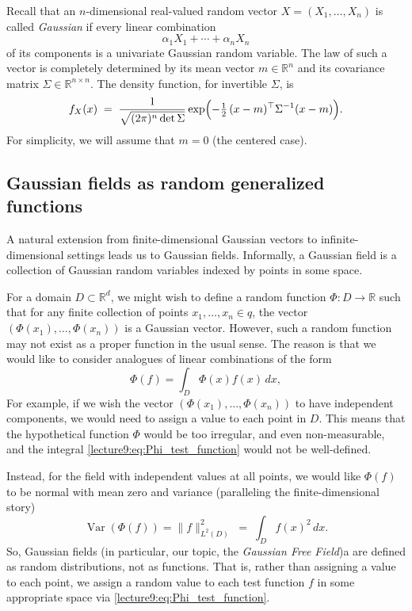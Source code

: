 \documentclass[letterpaper,11pt,oneside,reqno]{book}
\numberwithin{equation}{chapter}  %
\theoremstyle{definition}
\begin{document}
Recall that an $n$-dimensional real-valued random vector $X = (X_1,\dots, X_n)$ is called \emph{Gaussian} if every linear combination
\[
\alpha_1 X_1 + \cdots + \alpha_n X_n
\]
of its components is a univariate Gaussian random variable. The law of such a vector is completely determined by its mean vector $m \in \mathbb{R}^n$ and its covariance matrix $\Sigma \in \mathbb{R}^{n\times n}$. The density function, for invertible $\Sigma$, is
\[
f_{X}(x) \;=\; \frac{1}{\sqrt{(2\pi)^n \det \Sigma}}
\exp\Bigl(-\tfrac{1}{2}\,(x - m)^\top \Sigma^{-1}(x - m)\Bigr).
\]
For simplicity, we will assume that $m = 0$ (the centered case).

\subsection{Gaussian fields as random generalized functions}

A natural extension from finite-dimensional Gaussian vectors to infinite-dimensional settings leads us to Gaussian fields. Informally, a Gaussian field is a collection of Gaussian random variables indexed by points in some space.

For a domain $D \subset \mathbb{R}^d$, we might wish to
define a random function $\Phi: D \rightarrow \mathbb{R}$
such that for any finite collection of points $x_1, \ldots,
x_n \in q$, the vector $(\Phi(x_1), \ldots, \Phi(x_n))$ is a
Gaussian vector. However, such a random function may not
exist as a proper function in the usual sense.
The reason is that we would like to consider analogues of linear combinations
of the form
\begin{equation}
	\label{lecture9:eq:Phi_test_function}
    \Phi(f) = \int_D \Phi(x) f(x) \, dx,
\end{equation}
For example, if we wish the vector $(\Phi(x_1), \ldots, \Phi(x_n))$ to have independent components, we would need to assign a value to each point in $D$. This means that the hypothetical function $\Phi$ would be too irregular, and even non-measurable, and the integral
\eqref{lecture9:eq:Phi_test_function} would not be well-defined.

Instead, for the field with independent values at all points, we would like $\Phi(f)$ to be normal
with mean zero and variance (paralleling the finite-dimensional story)
\begin{equation*}
	\operatorname{\mathrm{Var}}\left(
	\Phi(f)\right) = \|f\|^2_{L^2(D)} \;=\; \int_D f(x)^2 \, dx.
\end{equation*}
So, Gaussian fields (in particular, our topic, the \emph{Gaussian Free Field})a
are defined as random distributions, not as functions.
That is, rather than assigning a value to each point,
we assign a random value to each test function $f$ in some appropriate space
via \eqref{lecture9:eq:Phi_test_function}.
\end{document}
